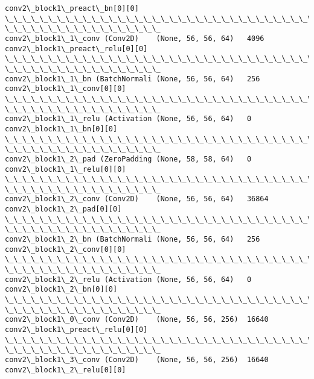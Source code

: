 \documentclass[11pt]{article}
\begin{document}
\begin{Verbatim}[commandchars=\\\{\}]
conv2\_block1\_preact\_bn[0][0]
\_\_\_\_\_\_\_\_\_\_\_\_\_\_\_\_\_\_\_\_\_\_\_\_\_\_\_\_\_\_\_\_\_\_\_\_\_\_\_\_\_\_\_\_\_\_\_\_\_\_\_\_\_\_\_\_\_\_\_\_\_\_\_\_\_\_\_\_\_\_\_\_\_\_\_\_\_\_\_\_
\_\_\_\_\_\_\_\_\_\_\_\_\_\_\_\_\_\_
conv2\_block1\_1\_conv (Conv2D)    (None, 56, 56, 64)   4096
conv2\_block1\_preact\_relu[0][0]
\_\_\_\_\_\_\_\_\_\_\_\_\_\_\_\_\_\_\_\_\_\_\_\_\_\_\_\_\_\_\_\_\_\_\_\_\_\_\_\_\_\_\_\_\_\_\_\_\_\_\_\_\_\_\_\_\_\_\_\_\_\_\_\_\_\_\_\_\_\_\_\_\_\_\_\_\_\_\_\_
\_\_\_\_\_\_\_\_\_\_\_\_\_\_\_\_\_\_
conv2\_block1\_1\_bn (BatchNormali (None, 56, 56, 64)   256
conv2\_block1\_1\_conv[0][0]
\_\_\_\_\_\_\_\_\_\_\_\_\_\_\_\_\_\_\_\_\_\_\_\_\_\_\_\_\_\_\_\_\_\_\_\_\_\_\_\_\_\_\_\_\_\_\_\_\_\_\_\_\_\_\_\_\_\_\_\_\_\_\_\_\_\_\_\_\_\_\_\_\_\_\_\_\_\_\_\_
\_\_\_\_\_\_\_\_\_\_\_\_\_\_\_\_\_\_
conv2\_block1\_1\_relu (Activation (None, 56, 56, 64)   0
conv2\_block1\_1\_bn[0][0]
\_\_\_\_\_\_\_\_\_\_\_\_\_\_\_\_\_\_\_\_\_\_\_\_\_\_\_\_\_\_\_\_\_\_\_\_\_\_\_\_\_\_\_\_\_\_\_\_\_\_\_\_\_\_\_\_\_\_\_\_\_\_\_\_\_\_\_\_\_\_\_\_\_\_\_\_\_\_\_\_
\_\_\_\_\_\_\_\_\_\_\_\_\_\_\_\_\_\_
conv2\_block1\_2\_pad (ZeroPadding (None, 58, 58, 64)   0
conv2\_block1\_1\_relu[0][0]
\_\_\_\_\_\_\_\_\_\_\_\_\_\_\_\_\_\_\_\_\_\_\_\_\_\_\_\_\_\_\_\_\_\_\_\_\_\_\_\_\_\_\_\_\_\_\_\_\_\_\_\_\_\_\_\_\_\_\_\_\_\_\_\_\_\_\_\_\_\_\_\_\_\_\_\_\_\_\_\_
\_\_\_\_\_\_\_\_\_\_\_\_\_\_\_\_\_\_
conv2\_block1\_2\_conv (Conv2D)    (None, 56, 56, 64)   36864
conv2\_block1\_2\_pad[0][0]
\_\_\_\_\_\_\_\_\_\_\_\_\_\_\_\_\_\_\_\_\_\_\_\_\_\_\_\_\_\_\_\_\_\_\_\_\_\_\_\_\_\_\_\_\_\_\_\_\_\_\_\_\_\_\_\_\_\_\_\_\_\_\_\_\_\_\_\_\_\_\_\_\_\_\_\_\_\_\_\_
\_\_\_\_\_\_\_\_\_\_\_\_\_\_\_\_\_\_
conv2\_block1\_2\_bn (BatchNormali (None, 56, 56, 64)   256
conv2\_block1\_2\_conv[0][0]
\_\_\_\_\_\_\_\_\_\_\_\_\_\_\_\_\_\_\_\_\_\_\_\_\_\_\_\_\_\_\_\_\_\_\_\_\_\_\_\_\_\_\_\_\_\_\_\_\_\_\_\_\_\_\_\_\_\_\_\_\_\_\_\_\_\_\_\_\_\_\_\_\_\_\_\_\_\_\_\_
\_\_\_\_\_\_\_\_\_\_\_\_\_\_\_\_\_\_
conv2\_block1\_2\_relu (Activation (None, 56, 56, 64)   0
conv2\_block1\_2\_bn[0][0]
\_\_\_\_\_\_\_\_\_\_\_\_\_\_\_\_\_\_\_\_\_\_\_\_\_\_\_\_\_\_\_\_\_\_\_\_\_\_\_\_\_\_\_\_\_\_\_\_\_\_\_\_\_\_\_\_\_\_\_\_\_\_\_\_\_\_\_\_\_\_\_\_\_\_\_\_\_\_\_\_
\_\_\_\_\_\_\_\_\_\_\_\_\_\_\_\_\_\_
conv2\_block1\_0\_conv (Conv2D)    (None, 56, 56, 256)  16640
conv2\_block1\_preact\_relu[0][0]
\_\_\_\_\_\_\_\_\_\_\_\_\_\_\_\_\_\_\_\_\_\_\_\_\_\_\_\_\_\_\_\_\_\_\_\_\_\_\_\_\_\_\_\_\_\_\_\_\_\_\_\_\_\_\_\_\_\_\_\_\_\_\_\_\_\_\_\_\_\_\_\_\_\_\_\_\_\_\_\_
\_\_\_\_\_\_\_\_\_\_\_\_\_\_\_\_\_\_
conv2\_block1\_3\_conv (Conv2D)    (None, 56, 56, 256)  16640
conv2\_block1\_2\_relu[0][0]

\end{Verbatim}
\end{document}
